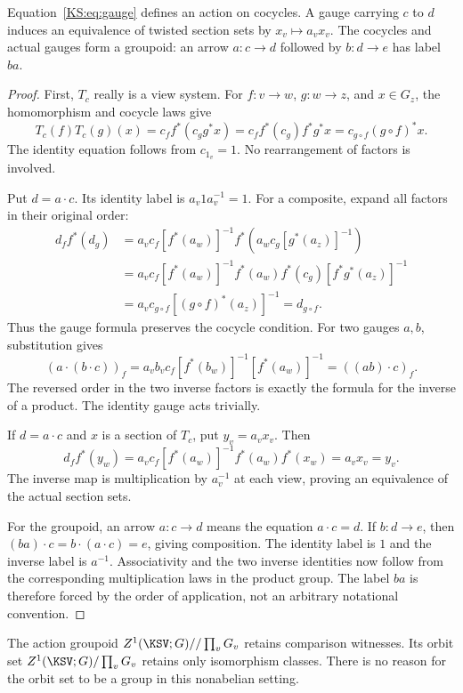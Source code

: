 \begin{KSproposition}\label{KS:KS30}
Equation~\eqref{KS:eq:gauge} defines an action on cocycles. A gauge carrying \(c\) to \(d\) induces an equivalence of twisted section sets by \(x_v\mapsto a_vx_v\). The cocycles and actual gauges form a groupoid: an arrow \(a:c\to d\) followed by \(b:d\to e\) has label \(ba\).
\end{KSproposition}
\begin{proof}
First, $T_c$ really is a view system. For $f:v\to w$, $g:w\to z$, and $x\in G_z$, the homomorphism and cocycle laws give
\[
 T_c(f)T_c(g)(x)=c_ff^*(c_gg^*x)
 =c_ff^*(c_g)f^*g^*x=c_{g\circ f}(g\circ f)^*x.
\]
The identity equation follows from $c_{1_v}=1$. No rearrangement of factors is involved.

Put $d=a\cdot c$. Its identity label is $a_v1a_v^{-1}=1$. For a composite, expand all factors in their original order:
\[
\begin{aligned}
 d_f f^*(d_g)
 &=a_vc_f[f^*(a_w)]^{-1}
   f^*(a_wc_g[g^*(a_z)]^{-1})\\
 &=a_vc_f[f^*(a_w)]^{-1}f^*(a_w)f^*(c_g)
       [f^*g^*(a_z)]^{-1}\\
 &=a_vc_{g\circ f}[(g\circ f)^*(a_z)]^{-1}
 =d_{g\circ f}.
\end{aligned}
\]
Thus the gauge formula preserves the cocycle condition. For two gauges $a,b$, substitution gives
\[
 (a\cdot(b\cdot c))_f
 =a_vb_vc_f[f^*(b_w)]^{-1}[f^*(a_w)]^{-1}
 =((ab)\cdot c)_f.
\]
The reversed order in the two inverse factors is exactly the formula for the inverse of a product. The identity gauge acts trivially.

If $d=a\cdot c$ and $x$ is a section of $T_c$, put $y_v=a_vx_v$. Then
\[
 d_ff^*(y_w)
 =a_vc_f[f^*(a_w)]^{-1}f^*(a_w)f^*(x_w)
 =a_vx_v=y_v.
\]
The inverse map is multiplication by $a_v^{-1}$ at each view, proving an equivalence of the actual section sets.

For the groupoid, an arrow $a:c\to d$ means the equation $a\cdot c=d$. If $b:d\to e$, then $(ba)\cdot c=b\cdot(a\cdot c)=e$, giving composition. The identity label is $1$ and the inverse label is $a^{-1}$. Associativity and the two inverse identities now follow from the corresponding multiplication laws in the product group. The label $ba$ is therefore forced by the order of application, not an arbitrary notational convention.
\end{proof}
The action groupoid \(Z^1(\KSV;G)//\prod_vG_v\) retains comparison witnesses. Its orbit set \(Z^1(\KSV;G)/\prod_vG_v\) retains only isomorphism classes. There is no reason for the orbit set to be a group in this nonabelian setting.

